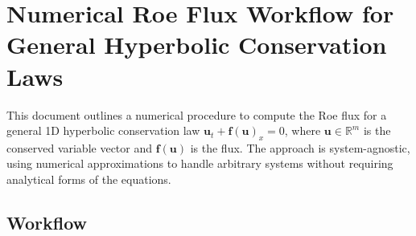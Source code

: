 \documentclass[12pt]{article}
\begin{document}
\section*{Numerical Roe Flux Workflow for General Hyperbolic Conservation Laws}

This document outlines a numerical procedure to compute the Roe flux for a general 1D hyperbolic conservation law \(\mathbf{u}_t + \mathbf{f}(\mathbf{u})_x = 0\), where \(\mathbf{u} \in \mathbb{R}^m\) is the conserved variable vector and \(\mathbf{f}(\mathbf{u})\) is the flux. The approach is system-agnostic, using numerical approximations to handle arbitrary systems without requiring analytical forms of the equations.

\subsection*{Workflow}
\end{document}
